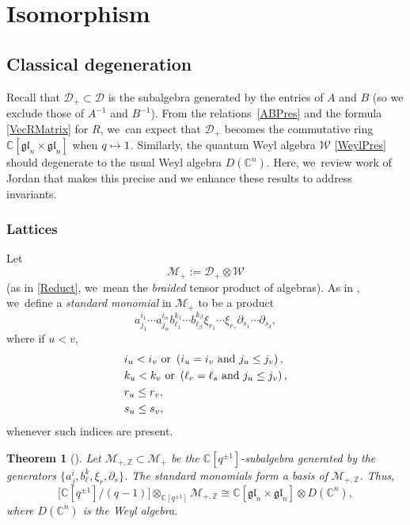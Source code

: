 \documentclass[11pt]{article}
\newcommand\mto{\mathchoice{\longmapsto}{\mapsto}{\mapsto}{\mapsto}}
\newtheorem{thm}{Theorem}[section]
\theoremstyle{definition}
\newcommand{\ZZ}{\mathbb{Z}}
\newcommand{\CC}{\mathbb{C}}
\newcommand{\DD}{\mathcal{D}}
\newcommand{\WW}{\mathcal{W}}
\newcommand{\MM}{\mathcal{M}}
\newcommand{\del}{\partial}
\begin{document}
\section{Isomorphism}

\subsection{Classical degeneration}\label{ClassDegen}
Recall that $\DD_+\subset\DD$ is the subalgebra generated by the entries of $A$ and $B$ (so we exclude those of $A^{-1}$ and $B^{-1}$).
From the relations~\eqref{ABPres} and the formula \eqref{VecRMatrix} for $R$, we~can expect that $\DD_+$ becomes the commutative ring $\CC[\mathfrak{gl}_n\times\mathfrak{gl}_n]$ when $q\mto1$.
Similarly, the quantum Weyl algebra $\WW$ \eqref{WeylPres} should degenerate to the usual Weyl algebra $D(\CC^n)$.
Here, we~review work of Jordan \cite{JordanMult} that makes this precise and we enhance these results to address invariants.

\subsubsection{Lattices}
Let
\[
\MM_+:=\DD_+\otimes\WW
\]
(as in \ref{Reduct}, we~mean the \textit{braided} tensor product of algebras).
As in \cite{JordanMult}, we~define a \textit{standard monomial} in $\MM_+$ to be a product
\begin{equation}
a^{i_1}_{j_1}\cdots a^{i_{\alpha}}_{j_{\alpha}}
b^{k_1}_{\ell_1}\cdots b^{k_{\beta}}_{\ell_{\beta}}
\xi_{r_1}\cdots \xi_{r_\gamma}
\del_{s_1}\cdots\del_{s_\delta},
\label{StandardMon}
\end{equation}
where if $u<v$,
\begin{equation}
\begin{aligned}
&i_u<i_v\hbox{ or }\left(i_u=i_v\hbox{ and }j_u\le j_v\right),\\
&k_u<k_v\hbox{ or }\left(\ell_r=\ell_s\hbox{ and }j_u\le j_v\right),\\
&r_u\le r_v,\\
&s_u\le s_v,
\end{aligned}
\label{StandardIndices}
\end{equation}
whenever such indices are present.

\begin{thm}[\cite{JordanMult}]\label{JorBasis}
Let $\MM_{+,\ZZ}\subset\MM_+$ be the $\CC[q^{\pm 1}]$-subalgebra generated by the generators $\{a^i_j, b^k_\ell, \xi_r, \del_s\}$.
The standard monomials form a basis of $\MM_{+,\ZZ}$.
Thus,
\[
\bigl[ \CC[q^{\pm1}]\big/(q-1) \bigr]\otimes_{\CC[q^{\pm 1}]}\MM_{+,\ZZ}\cong \CC[\mathfrak{gl}_n\times\mathfrak{gl}_n]\otimes D(\CC^n),
\]
where $D(\CC^n)$ is the Weyl algebra.
\end{thm}
\end{document}
